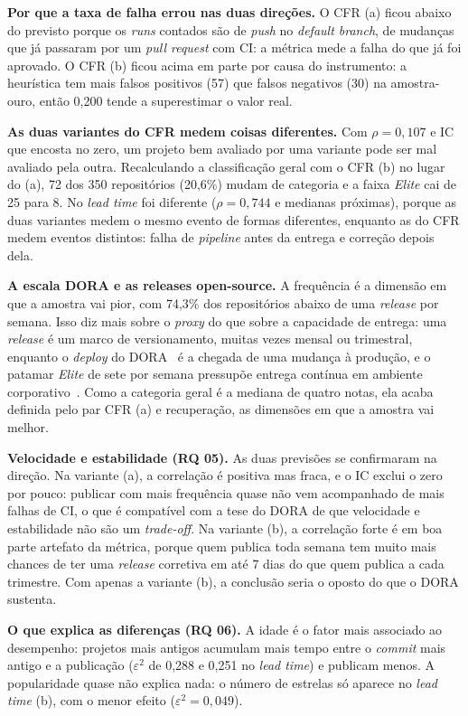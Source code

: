 \textbf{Por que a taxa de falha errou nas duas direções.} O CFR (a) ficou abaixo do previsto
porque os \textit{runs} contados são de \textit{push} no \textit{default branch}, de mudanças
que já passaram por um \textit{pull request} com CI: a métrica mede a falha do que já foi
aprovado. O CFR (b) ficou acima em parte por causa do instrumento: a heurística tem mais falsos
positivos (57) que falsos negativos (30) na amostra-ouro, então 0,200 tende a superestimar o
valor real.

\textbf{As duas variantes do CFR medem coisas diferentes.} Com $\rho = 0{,}107$ e IC que
encosta no zero, um projeto bem avaliado por uma variante pode ser mal avaliado pela outra.
Recalculando a classificação geral com o CFR (b) no lugar do (a), 72 dos 350 repositórios
(20,6\%) mudam de categoria e a faixa \textit{Elite} cai de 25 para 8. No \textit{lead time} foi
diferente ($\rho = 0{,}744$ e medianas próximas), porque as duas variantes medem o mesmo evento
de formas diferentes, enquanto as do CFR medem eventos distintos: falha de \textit{pipeline}
antes da entrega e correção depois dela.

\textbf{A escala DORA e as releases open-source.} A frequência é a dimensão em que a amostra vai
pior, com 74,3\% dos repositórios abaixo de uma \textit{release} por semana. Isso diz mais sobre o
\textit{proxy} do que sobre a capacidade de entrega: uma \textit{release} é um marco de
versionamento, muitas vezes mensal ou trimestral, enquanto o \textit{deploy} do
DORA~\cite{dora2024} é a chegada de uma mudança à produção, e o patamar \textit{Elite} de sete por
semana pressupõe entrega contínua em ambiente corporativo~\cite{forsgren2018}. Como a categoria
geral é a mediana de quatro notas, ela acaba definida pelo par CFR (a) e recuperação, as
dimensões em que a amostra vai melhor.

\textbf{Velocidade e estabilidade (RQ 05).} As duas previsões se confirmaram na direção. Na
variante (a), a correlação é positiva mas fraca, e o IC exclui o zero por pouco: publicar com
mais frequência quase não vem acompanhado de mais falhas de CI, o que é compatível com a tese do
DORA de que velocidade e estabilidade não são um \textit{trade-off}. Na variante (b), a
correlação forte é em boa parte artefato da métrica, porque quem publica toda semana tem muito
mais chances de ter uma \textit{release} corretiva em até 7 dias do que quem publica a cada
trimestre. Com apenas a variante (b), a conclusão seria o oposto do que o DORA sustenta.

\textbf{O que explica as diferenças (RQ 06).} A idade é o fator mais associado ao desempenho:
projetos mais antigos acumulam mais tempo entre o \textit{commit} mais antigo e a publicação
($\varepsilon^2$ de 0,288 e 0,251 no \textit{lead time}) e publicam menos. A popularidade
quase não explica nada: o número de estrelas só aparece no \textit{lead time} (b), com o menor
efeito ($\varepsilon^2 = 0{,}049$).

